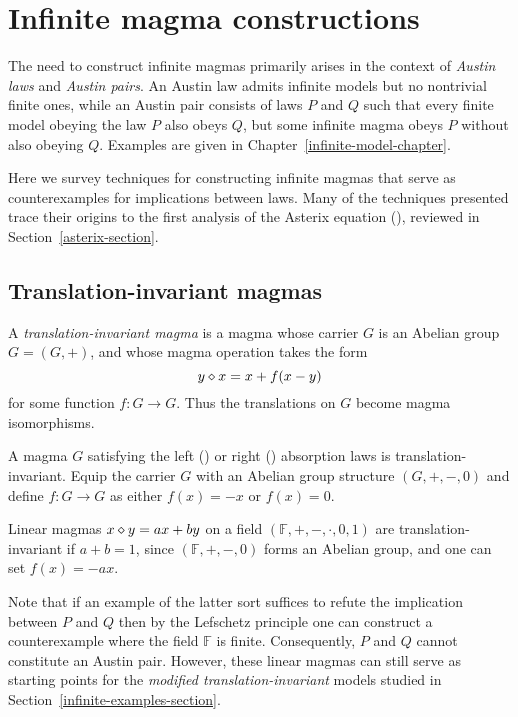 \chapter{Infinite magma constructions}\label{infinite-magma-constructions-chapter}

The need to construct infinite magmas primarily arises in the context of \emph{Austin laws} and \emph{Austin pairs}.
An Austin law admits infinite models but no nontrivial finite ones, while an Austin pair consists of
laws $P$ and $Q$ such that every finite model obeying the law $P$ also obeys $Q$, but some
infinite magma obeys $P$ without also obeying $Q$. Examples are given in Chapter~\ref{infinite-model-chapter}.

Here we survey techniques for constructing infinite magmas that serve as counterexamples for implications
between laws. Many of the techniques presented trace their origins to the first analysis of the Asterix equation
(), reviewed in Section~\ref{asterix-section}.

\section{Translation-invariant magmas}

A \emph{translation-invariant magma} is a magma whose carrier $G$ is an Abelian group $G = (G,+)$, and whose magma operation takes the form
$$ y \diamond x = x + f(x-y)$$
for some function $f: G \to G$.  Thus the translations on $G$ become magma isomorphisms.

\begin{example}
  A magma $G$ satisfying the left () or right () absorption laws is translation-invariant.
  Equip the carrier $G$ with an Abelian group structure $(G,+,-,0)$ and define $f: G \to G$ as either $f(x) = -x$ or $f(x) = 0$.
\end{example}

\begin{example}
  Linear magmas $x\diamond y = ax+by$ on a field $(\mathbb{F},+,-,\cdot,0,1)$ are translation-invariant if $a + b = 1$,
  since $(\mathbb{F},+,-,0)$ forms an Abelian group, and one can set $f(x) = -ax$.
\end{example}

Note that if an example of the latter sort suffices to refute the implication between $P$ and $Q$ then
by the Lefschetz principle one can construct a counterexample where the field $\mathbb{F}$ is finite.
Consequently, $P$ and $Q$ cannot constitute an Austin pair. However, these linear magmas can still serve
as starting points for the \emph{modified translation-invariant} models studied in Section~\ref{infinite-examples-section}.

